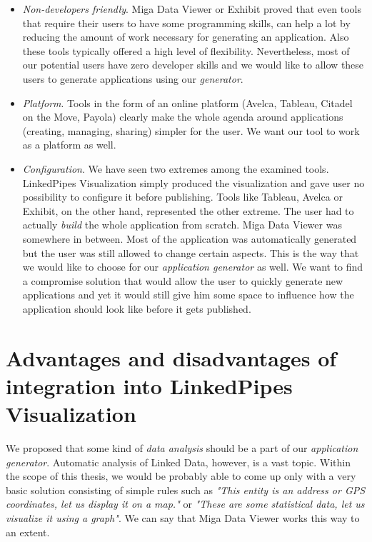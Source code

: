 \begin{itemize}
\item \emph{Non-developers friendly}. Miga Data Viewer or Exhibit proved that even tools that require their users to have some programming skills, can help a lot by reducing the amount of work necessary for generating an application. Also these tools typically offered a high level of flexibility. Nevertheless, most of our potential users have zero developer skills and we would like to allow these users to generate applications using our \emph{generator}.
\item \emph{Platform}. Tools in the form of an online platform (Avelca, Tableau, Citadel on the Move, Payola) clearly make the whole agenda around applications (creating, managing, sharing) simpler for the user. We want our tool to work as a platform as well.
\item \emph{Configuration}. We have seen two extremes among the examined tools. LinkedPipes Visualization simply produced the visualization and gave user no possibility to configure it before publishing. Tools like Tableau, Avelca or Exhibit, on the other hand, represented the other extreme. The user had to actually \emph{build} the whole application from scratch. Miga Data Viewer was somewhere in between. Most of the application was automatically generated but the user was still allowed to change certain aspects. This is the way that we would like to choose for our \emph{application generator} as well. We want to find a compromise solution that would allow the user to quickly generate new applications and yet it would still give him some space to influence how the application should look like before it gets published.
\end{itemize}

\section{Advantages and disadvantages of integration into LinkedPipes Visualization}

We proposed that some kind of \emph{data analysis} should be a part of our \emph{application generator}. Automatic analysis of Linked Data, however, is a vast topic. Within the scope of this thesis, we would be probably able to come up only with a very basic solution consisting of simple rules such as  \textit{"This entity is an address or GPS coordinates, let us display it on a map."} or \textit{"These are some statistical data, let us visualize it using a graph"}. We can say that Miga Data Viewer works this way to an extent.

